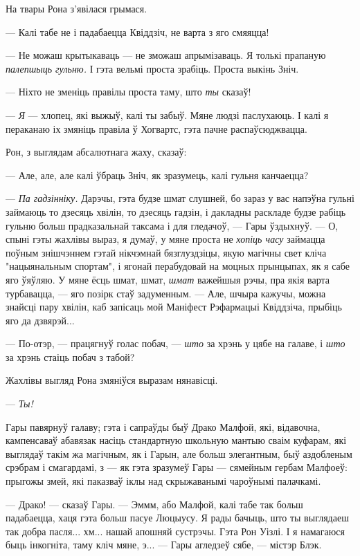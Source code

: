 На твары Рона з'явілася грымася.

--- Калі табе не і падабаецца Квіддзіч, не варта з яго смяяцца!

--- Не можаш крытыкаваць --- не зможаш апрымізаваць. Я толькі прапаную 
\emph{палепшыць гульню.} І гэта вельмі проста зрабіць. Проста выкінь Зніч.

--- Ніхто не зменіць правілы проста таму, што \emph{ты} сказаў!

--- \emph{Я} --- хлопец, які выжыў, калі ты забыў. Мяне людзі паслухаюць. І калі 
я пераканаю іх змяніць правіла ў Хогвартс, гэта пачне распаўсюджвацца.

Рон, з выглядам абсалютнага жаху, сказаў:

--- Але, але, але калі ўбраць Зніч, як зразумець, калі гульня канчаецца?

--- \emph{Па гадзінніку.} Дарэчы, гэта будзе шмат слушней, бо зараз у вас 
напэўна гульні займаюць то дзесяць хвілін, то дзесяць гадзін, і дакладны
раскладе будзе рабіць гульню больш прадказальнай таксама і для гледачоў, ---
Гары ўздыхнуў. --- О, спыні гэты жахлівы выраз, я думаў, у мяне проста не 
\emph{хопіць часу} займацца поўным знішчэннем гэтай нікчэмнай бязглуздзіцы,
якую магічны свет кліча "нацыянальным спортам", і ягонай перабудовай 
на моцных прынцыпах, як я сабе яго ўяўляю. У мяне ёсць шмат, шмат, \emph{шмат}
важейшыя рэчы, пра якія варта турбавацца, ---  яго позірк стаў задуменным. ---
Але, шчыра кажучы, можна знайсці пару хвілін, каб запісаць мой Маніфест 
Рэфармацыі Квіддзіча, прыбіць яго да дзвярэй...

--- По-отэр, --- працягнуў голас побач, --- \emph{што} за хрэнь у цябе на галаве,
і \emph{што} за хрэнь стаіць побач з табой?

Жахлівы выгляд Рона змяніўся выразам нянавісці.

--- \emph{Ты!}

Гары павярнуў галаву; гэта і сапраўды быў Драко Малфой, які, відавочна, 
кампенсаваў абавязак насіць стандартную школьную мантыю сваім куфарам, які 
выглядаў такім жа магічным, як і Гарын, але больш элегантным, быў аздобленым 
срэбрам і смагардамі, з --- як гэта зразумеў Гары --- сямейным гербам Малфоеў:
прыгожы змей, які паказваў іклы над скрыжаванымі чароўнымі палачкамі.  

--- Драко! --- сказаў Гары. --- Эммм, або Малфой, калі табе так больш падабаецца,
хаця гэта больш пасуе Люцыусу. Я рады бачыць, што ты выглядаеш так добра пасля...
хм... нашай апошняй сустрэчы. Гэта Рон Уізлі. І я намагаюся быць інкогніта, 
таму кліч мяне, э... --- Гары агледзеў сябе, --- містэр Блэк.

